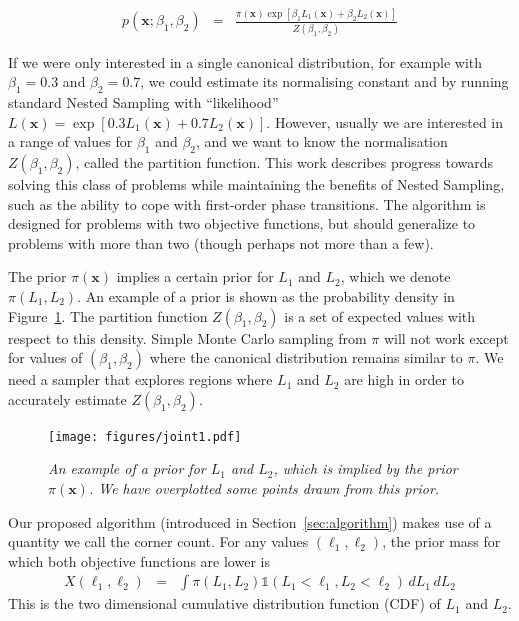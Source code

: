 \documentclass[journal,article,accept,moreauthors,pdftex,12pt,a4paper]{mdpi}
\newcommand{\xx}{\boldsymbol{x}}
\begin{document}
\begin{eqnarray}
p(\xx; \beta_1, \beta_2) &=& \frac{\pi(\xx)\exp\left[\beta_1L_1(\xx)+\beta_2L_2(\xx)\right]}
{Z(\beta_1, \beta_2)}
\end{eqnarray}

If we were only interested in a single canonical distribution, for example
with $\beta_1 = 0.3$ and $\beta_2 = 0.7$, we could estimate its normalising
constant and by running standard Nested Sampling with ``likelihood''
$L(\xx) = \exp\left[0.3L_1(\xx) + 0.7L_2(\xx)\right]$. However, usually we
are interested in a range of values for $\beta_1$ and $\beta_2$, and we
want to know the normalisation $Z(\beta_1, \beta_2)$, called the
partition function. This work describes
progress towards solving this class of problems while maintaining the benefits
of Nested Sampling, such as the ability to cope with first-order phase
transitions. The algorithm is designed for problems with two objective
functions, but should generalize to problems with more than two (though perhaps
not more than a few).

The prior $\pi(\xx)$ implies a certain prior for $L_1$ and $L_2$, which we
denote $\pi(L_1, L_2)$. An example of a prior is shown as the
probability density in Figure~\ref{fig:joint1}. The partition function
$Z(\beta_1, \beta_2)$ is a set of expected values with respect to this density.
Simple Monte Carlo sampling from $\pi$ will not work except for values of
$(\beta_1, \beta_2)$ where the canonical distribution remains similar to $\pi$.
We need a sampler that explores regions where $L_1$ and $L_2$ are high in order
to accurately estimate $Z(\beta_1, \beta_2)$.

\begin{figure}
\centering
\texttt{[image: figures/joint1.pdf]}
\caption{\it An example of a prior for $L_1$ and $L_2$, which is implied by
the prior $\pi(\xx)$. We have overplotted some points drawn from this prior.
\label{fig:joint1}}
\end{figure}

Our proposed algorithm (introduced in Section~\ref{sec:algorithm}) makes use
of a quantity we call the corner count. For any values $(\ell_1, \ell_2)$,
the prior mass for which both objective functions are lower is
\begin{eqnarray}
X(\ell_1, \ell_2) &=& \int \pi(L_1, L_2) \mathds{1}\left(L_1 < \ell_1, L_2 < \ell_2 \right)
 \, dL_1 \, dL_2
\end{eqnarray}
This is the two dimensional cumulative distribution function (CDF) of
$L_1$ and $L_2$.
\end{document}
